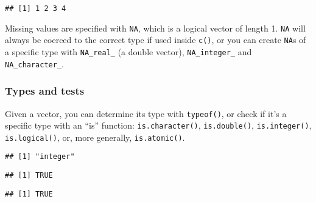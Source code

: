 \begin{verbatim}
## [1] 1 2 3 4
\end{verbatim}

Missing values are specified with \texttt{NA}, which is a logical vector
of length 1. \texttt{NA} will always be coerced to the correct type if
used inside \texttt{c()}, or you can create \texttt{NA}s of a specific
type with \texttt{NA\_real\_} (a double vector), \texttt{NA\_integer\_}
and \texttt{NA\_character\_}. 

\hypertarget{types-and-tests}{%
\subsubsection{Types and tests}\label{types-and-tests}}

Given a vector, you can determine its type with \texttt{typeof()}, or
check if it's a specific type with an ``is'' function:
\texttt{is.character()}, \texttt{is.double()}, \texttt{is.integer()},
\texttt{is.logical()}, or, more generally, \texttt{is.atomic()}.

\begin{Shaded}
\begin{Highlighting}[]
\StringTok{ }
\end{Highlighting}
\end{Shaded}

\begin{verbatim}
## [1] "integer"
\end{verbatim}

\begin{Shaded}
\begin{Highlighting}[]
\end{Highlighting}
\end{Shaded}

\begin{verbatim}
## [1] TRUE
\end{verbatim}

\begin{Shaded}
\begin{Highlighting}[]
\end{Highlighting}
\end{Shaded}

\begin{verbatim}
## [1] TRUE
\end{verbatim}

